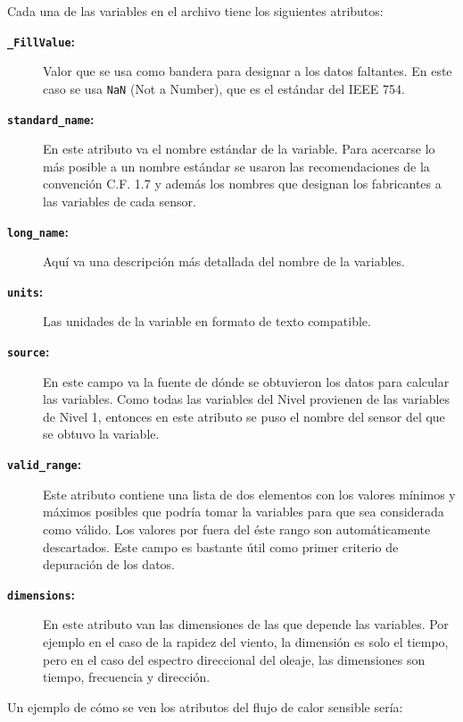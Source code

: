 \documentclass[11pt]{article}
\begin{document}
Cada una de las variables en el archivo tiene los siguientes atributos:
\begin{description}
  \item[\textbf{\texttt{\_FillValue}:}]
    Valor que se usa como bandera para designar a los datos faltantes. En este
    caso se usa \texttt{NaN} (Not a Number), que es el estándar del IEEE 754.

  \item[\textbf{\texttt{standard\_name}:}]
    En este atributo va el nombre estándar de la variable. Para acercarse lo más
    posible a un nombre estándar se usaron las recomendaciones de la convención
    C.F. 1.7 y además los nombres que designan los fabricantes a las variables
    de cada sensor. 

  \item[\textbf{\texttt{long\_name}:}]
    Aquí va una descripción más detallada del nombre de la variables.

  \item[\textbf{\texttt{units}:}]
    Las unidades de la variable en formato de texto compatible.

  \item[\textbf{\texttt{source}:}]
    En este campo va la fuente de dónde se obtuvieron los datos para calcular
    las variables. Como todas las variables del Nivel provienen de las variables
    de Nivel 1, entonces en este atributo se puso el nombre del sensor del que
    se obtuvo la variable.

  \item[\textbf{\texttt{valid\_range}:}]
    Este atributo contiene una lista de dos elementos con los valores mínimos y
    máximos posibles que podría tomar la variables para que sea considerada como
    válido. Los valores por fuera del éste rango son automáticamente
    descartados. Este campo es bastante útil como primer criterio de depuración
    de los datos.

  \item[\textbf{\texttt{dimensions}:}]
    En este atributo van las dimensiones de las que depende las variables. Por
    ejemplo en el caso de la rapidez del viento, la dimensión es solo el tiempo,
    pero en el caso del espectro direccional del oleaje, las dimensiones son
    tiempo, frecuencia y dirección.

\end{description}


Un ejemplo de cómo se ven los atributos del flujo de calor sensible sería:
\end{document}
